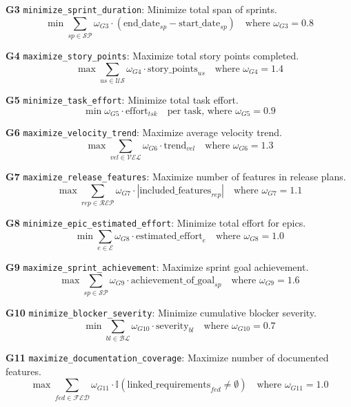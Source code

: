 \documentclass[12pt]{article}
\begin{document}
    \item[\textbf{G3}] \texttt{minimize\_sprint\_duration}: Minimize total span of sprints.
    \[
    \min \sum_{sp \in \mathcal{SP}} \omega_{G3} \cdot (\text{end\_date}_{sp} - \text{start\_date}_{sp}) \quad \text{where } \omega_{G3} = 0.8
    \]

    \item[\textbf{G4}] \texttt{maximize\_story\_points}: Maximize total story points completed.
    \[
    \max \sum_{us \in \mathcal{US}} \omega_{G4} \cdot \text{story\_points}_{us} \quad \text{where } \omega_{G4} = 1.4
    \]

    \item[\textbf{G5}] \texttt{minimize\_task\_effort}: Minimize total task effort.
    \[
    \min \omega_{G5} \cdot \text{effort}_{tsk} \quad \text{per task, where } \omega_{G5} = 0.9
    \]

    \item[\textbf{G6}] \texttt{maximize\_velocity\_trend}: Maximize average velocity trend.
    \[
    \max \sum_{vel \in \mathcal{VEL}} \omega_{G6} \cdot \text{trend}_{vel} \quad \text{where } \omega_{G6} = 1.3
    \]

    \item[\textbf{G7}] \texttt{maximize\_release\_features}: Maximize number of features in release plans.
    \[
    \max \sum_{rep \in \mathcal{REP}} \omega_{G7} \cdot |\text{included\_features}_{rep}| \quad \text{where } \omega_{G7} = 1.1
    \]

    \item[\textbf{G8}] \texttt{minimize\_epic\_estimated\_effort}: Minimize total effort for epics.
    \[
    \min \sum_{e \in \mathcal{E}} \omega_{G8} \cdot \text{estimated\_effort}_e \quad \text{where } \omega_{G8} = 1.0
    \]

    \item[\textbf{G9}] \texttt{maximize\_sprint\_achievement}: Maximize sprint goal achievement.
    \[
    \max \sum_{sp \in \mathcal{SP}} \omega_{G9} \cdot \text{achievement\_of\_goal}_{sp} \quad \text{where } \omega_{G9} = 1.6
    \]

    \item[\textbf{G10}] \texttt{minimize\_blocker\_severity}: Minimize cumulative blocker severity.
    \[
    \min \sum_{bl \in \mathcal{BL}} \omega_{G10} \cdot \text{severity}_{bl} \quad \text{where } \omega_{G10} = 0.7
    \]

    \item[\textbf{G11}] \texttt{maximize\_documentation\_coverage}: Maximize number of documented features.
    \[
    \max \sum_{fed \in \mathcal{FED}} \omega_{G11} \cdot \mathbb{I}(\text{linked\_requirements}_{fed} \neq \emptyset) \quad \text{where } \omega_{G11} = 1.0
    \]
\end{document}
